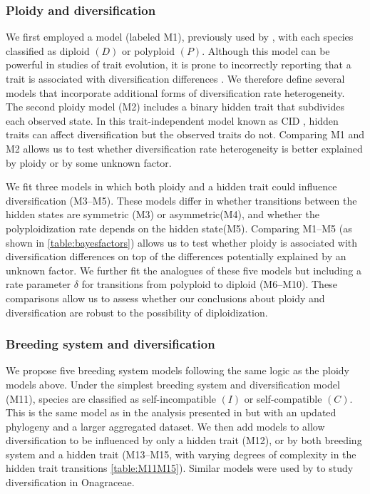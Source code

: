 \subsubsection{Ploidy and diversification}

We first employed a model (labeled M1), previously used by \citet{mayrose_2011}, with each species classified as diploid $(D)$ or polyploid $(P)$.
Although this model can be powerful in studies of trait evolution, it is prone to incorrectly reporting that a trait is associated with diversification differences \citep{maddison_2015, rabosky_2015}.
We therefore define several models that incorporate additional forms of diversification rate heterogeneity.
The second ploidy model (M2) includes a binary hidden trait that subdivides each observed state.
In this trait-independent model known as CID \citep{beaulieu_2016}, hidden traits can affect diversification but the observed traits do not.
Comparing M1 and M2 allows us to test whether diversification rate heterogeneity is better explained by ploidy or by some unknown factor.

We fit three models in which both ploidy and a hidden trait could influence diversification (M3--M5).
These models differ in whether transitions between the hidden states are symmetric (M3) or asymmetric(M4), and whether the polyploidization rate depends on the hidden state(M5). %
Comparing M1--M5 (as shown in \cref{table:bayesfactors}) allows us to test whether ploidy is associated with diversification differences on top of the differences potentially explained by an unknown factor.
We further fit the analogues of these five models but including a rate parameter $\delta$ for transitions from polyploid to diploid (M6--M10).
These comparisons allow us to assess whether our conclusions about ploidy and diversification are robust to the possibility of diploidization.

\subsubsection{Breeding system and diversification}

We propose five breeding system models following the same logic as the ploidy models above.
Under the simplest breeding system and diversification model (M11), species are classified as self-incompatible $(I)$ or self-compatible $(C)$.
This is the same model as in the analysis presented in \citet{goldberg_2010} but with an updated phylogeny \citep{sarkinen_2013} and a larger aggregated dataset.
We then add models to allow diversification to be influenced by only a hidden trait (M12), or by both breeding system and a hidden trait (M13--M15, with varying degrees of complexity in the hidden trait transitions \cref{table:M11M15}).
Similar models were used by \citet{freyman_2019} to study diversification in Onagraceae.

